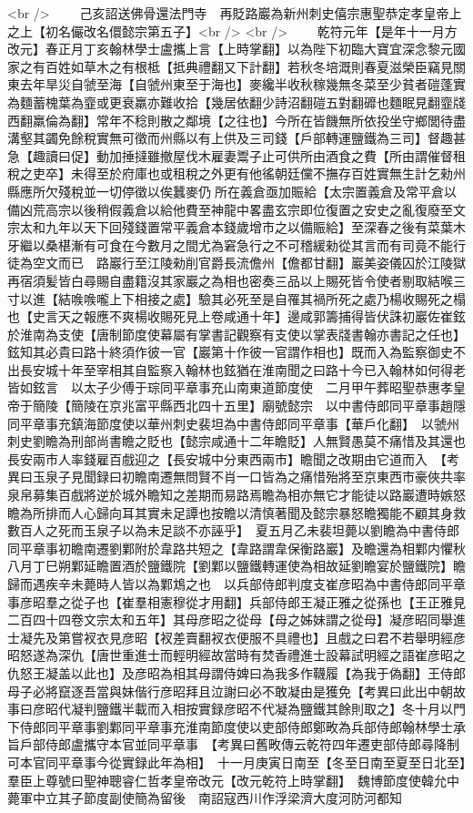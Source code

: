 <br />
　　己亥詔送佛骨還法門寺　再貶路巖為新州刺史僖宗惠聖恭定孝皇帝上之上【初名儼改名儇懿宗第五子】<br />
<br />
　　乾符元年【是年十一月方改元】春正月丁亥翰林學士盧攜上言【上時掌翻】以為陛下初臨大寶宜深念黎元國家之有百姓如草木之有根柢【抵典禮翻又下計翻】若秋冬培溉則春夏滋榮臣竊見關東去年旱災自虢至海【自虢州東至于海也】麥纔半收秋稼幾無冬菜至少貧者磑蓬實為麵蓄槐葉為韲或更衰羸亦難收拾【幾居依翻少詩沼翻磑五對翻䃺也麵眠見翻韲牋西翻羸倫為翻】常年不稔則散之鄰境【之往也】今所在皆饑無所依投坐守鄉閭待盡溝壑其蠲免餘稅實無可徵而州縣以有上供及三司錢【戶部轉運鹽鐵為三司】督趣甚急【趣讀曰促】動加捶撻雖撤屋伐木雇妻鬻子止可供所由酒食之費【所由謂催督租稅之吏卒】未得至於府庫也或租稅之外更有他徭朝廷儻不撫存百姓實無生計乞勑州縣應所欠殘稅並一切停徵以俟蠶麥仍所在義倉亟加賑給【太宗置義倉及常平倉以備凶荒高宗以後稍假義倉以給他費至神龍中畧盡玄宗即位復置之安史之亂復廢至文宗太和九年以天下回殘錢置常平義倉本錢歲增市之以備賑給】至深春之後有菜葉木牙繼以桑椹漸有可食在今數月之間尤為窘急行之不可稽緩勑從其言而有司竟不能行徒為空文而已　路巖行至江陵勑削官爵長流儋州【儋都甘翻】巖美姿儀囚於江陵獄再宿須髪皆白尋賜自盡籍沒其家巖之為相也密奏三品以上賜死皆令使者剔取結喉三寸以進【結㗋㗋嚨上下相接之處】驗其必死至是自罹其禍所死之處乃楊收賜死之榻也【史言天之報應不爽楊收賜死見上卷咸通十年】邊咸郭籌捕得皆伏誅初巖佐崔鉉於淮南為支使【唐制節度使幕屬有掌書記觀察有支使以掌表牋書翰亦書記之任也】鉉知其必貴曰路十終須作彼一官【巖第十作彼一官謂作相也】既而入為監察御史不出長安城十年至宰相其自監察入翰林也鉉猶在淮南聞之曰路十今已入翰林如何得老皆如鉉言　以太子少傅于琮同平章事充山南東道節度使　二月甲午葬昭聖恭惠孝皇帝于簡陵【簡陵在京兆富平縣西北四十五里】廟號懿宗　以中書侍郎同平章事趙隱同平章事充鎮海節度使以華州刺史裴坦為中書侍郎同平章事【華戶化翻】　以虢州刺史劉瞻為刑部尚書瞻之貶也【懿宗咸通十二年瞻貶】人無賢愚莫不痛惜及其還也長安兩市人率錢雇百戲迎之【長安城中分東西兩市】瞻聞之改期由它道而入　【考異曰玉泉子見聞録曰初瞻南遷無問賢不肖一口皆為之痛惜殆將至京東西市豪俠共率泉帛募集百戲將逆於城外瞻知之差期而易路焉瞻為相亦無它才能徒以路巖遭時嫉怒瞻為所排而人心歸向耳其實未足譚也按瞻以清慎著聞及懿宗暴怒瞻獨能不顧其身救數百人之死而玉泉子以為未足談不亦誣乎】　夏五月乙未裴坦薨以劉瞻為中書侍郎同平章事初瞻南遷劉鄴附於韋路共短之【韋路謂韋保衡路巖】及瞻還為相鄴内懼秋八月丁巳朔鄴延瞻置酒於鹽鐵院【劉鄴以鹽鐵轉運使為相故延劉瞻宴於鹽鐵院】瞻歸而遇疾辛未薨時人皆以為鄴鴆之也　以兵部侍郎判度支崔彦昭為中書侍郎同平章事彦昭羣之從子也【崔羣相憲穆從才用翻】兵部侍郎王凝正雅之從孫也【王正雅見二百四十四卷文宗太和五年】其母彦昭之從母【母之姊妹謂之從母】凝彦昭同舉進士凝先及第嘗衩衣見彦昭【衩差賣翻衩衣便服不具禮也】且戲之曰君不若舉明經彦昭怒遂為深仇【唐世重進士而輕明經故當時有焚香禮進士設幕試明經之語崔彦昭之仇怒王凝盖以此也】及彦昭為相其母謂侍婢曰為我多作韈履【為我于偽翻】王侍郎母子必將竄逐吾當與妹偕行彦昭拜且泣謝曰必不敢凝由是獲免【考異曰此出中朝故事曰彦昭代凝判鹽鐵半載而入相按實録彦昭不代凝為鹽鐵其餘則取之】冬十月以門下侍郎同平章事劉鄴同平章事充淮南節度使以吏部侍郎鄭畋為兵部侍郎翰林學士承旨戶部侍郎盧攜守本官並同平章事　【考異曰舊畋傳云乾符四年遷吏部侍郎尋降制可本官同平章事今從實録此年為相】　十一月庚寅日南至【冬至日南至夏至日北至】羣臣上尊號曰聖神聰睿仁哲孝皇帝改元【改元乾符上時掌翻】　魏博節度使韓允中薨軍中立其子節度副使簡為留後　南詔寇西川作浮梁濟大度河防河都知